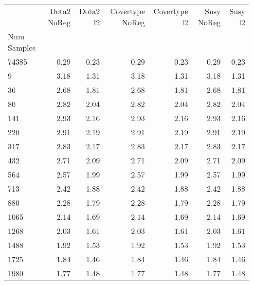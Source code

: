 \begin{table}
\centering
\caption{}
\label{}
\begin{tabular}{lrrrrrr}
\toprule
{} &  Dota2 NoReg &  Dota2 l2 &  Covertype NoReg &  Covertype l2 &  Susy NoReg &  Susy l2 \\
Num Samples &              &           &                  &               &             &          \\
\midrule
74385       &         0.29 &      0.23 &             0.29 &          0.23 &        0.29 &     0.23 \\
9           &         3.18 &      1.31 &             3.18 &          1.31 &        3.18 &     1.31 \\
36          &         2.68 &      1.81 &             2.68 &          1.81 &        2.68 &     1.81 \\
80          &         2.82 &      2.04 &             2.82 &          2.04 &        2.82 &     2.04 \\
141         &         2.93 &      2.16 &             2.93 &          2.16 &        2.93 &     2.16 \\
220         &         2.91 &      2.19 &             2.91 &          2.19 &        2.91 &     2.19 \\
317         &         2.83 &      2.17 &             2.83 &          2.17 &        2.83 &     2.17 \\
432         &         2.71 &      2.09 &             2.71 &          2.09 &        2.71 &     2.09 \\
564         &         2.57 &      1.99 &             2.57 &          1.99 &        2.57 &     1.99 \\
713         &         2.42 &      1.88 &             2.42 &          1.88 &        2.42 &     1.88 \\
880         &         2.28 &      1.79 &             2.28 &          1.79 &        2.28 &     1.79 \\
1065        &         2.14 &      1.69 &             2.14 &          1.69 &        2.14 &     1.69 \\
1268        &         2.03 &      1.61 &             2.03 &          1.61 &        2.03 &     1.61 \\
1488        &         1.92 &      1.53 &             1.92 &          1.53 &        1.92 &     1.53 \\
1725        &         1.84 &      1.46 &             1.84 &          1.46 &        1.84 &     1.46 \\
1980        &         1.77 &      1.48 &             1.77 &          1.48 &        1.77 &     1.48 \\
\bottomrule
\end{tabular}
\end{table}
